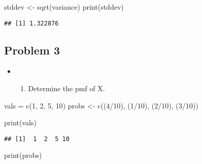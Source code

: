 \documentclass[
]{article}
\newenvironment{Shaded}{\begin{snugshade}}{\end{snugshade}}
\newcommand{\DecValTok}[1]{\textcolor[rgb]{0.00,0.00,0.81}{#1}}
\newcommand{\FunctionTok}[1]{\textcolor[rgb]{0.00,0.00,0.00}{#1}}
\newcommand{\NormalTok}[1]{#1}
\newcommand{\OtherTok}[1]{\textcolor[rgb]{0.56,0.35,0.01}{#1}}
\newcommand{\SpecialCharTok}[1]{\textcolor[rgb]{0.00,0.00,0.00}{#1}}
\providecommand{\tightlist}{%
  \setlength{\itemsep}{0pt}\setlength{\parskip}{0pt}}
\begin{document}
\begin{Shaded}
\begin{Highlighting}[]
\NormalTok{stddev }\OtherTok{\textless{}{-}} \FunctionTok{sqrt}\NormalTok{(variance)}
\FunctionTok{print}\NormalTok{(stddev)}
\end{Highlighting}
\end{Shaded}

\begin{verbatim}
## [1] 1.322876
\end{verbatim}

\hfill\break

\hypertarget{problem-3}{%
\subsection{Problem 3}\label{problem-3}}

\begin{itemize}
\item
  \begin{enumerate}
  \def\labelenumi{\alph{enumi})}
  \tightlist
  \item
    Determine the pmf of X.
  \end{enumerate}
\end{itemize}

\begin{Shaded}
\begin{Highlighting}[]
\NormalTok{vals }\OtherTok{=} \FunctionTok{c}\NormalTok{(}\DecValTok{1}\NormalTok{, }\DecValTok{2}\NormalTok{, }\DecValTok{5}\NormalTok{, }\DecValTok{10}\NormalTok{)}
\NormalTok{probs }\OtherTok{\textless{}{-}} \FunctionTok{c}\NormalTok{((}\DecValTok{4}\SpecialCharTok{/}\DecValTok{10}\NormalTok{), (}\DecValTok{1}\SpecialCharTok{/}\DecValTok{10}\NormalTok{), (}\DecValTok{2}\SpecialCharTok{/}\DecValTok{10}\NormalTok{), (}\DecValTok{3}\SpecialCharTok{/}\DecValTok{10}\NormalTok{))}

\FunctionTok{print}\NormalTok{(vals)}
\end{Highlighting}
\end{Shaded}

\begin{verbatim}
## [1]  1  2  5 10
\end{verbatim}

\begin{Shaded}
\begin{Highlighting}[]
\FunctionTok{print}\NormalTok{(probs)}
\end{Highlighting}
\end{Shaded}
\end{document}
